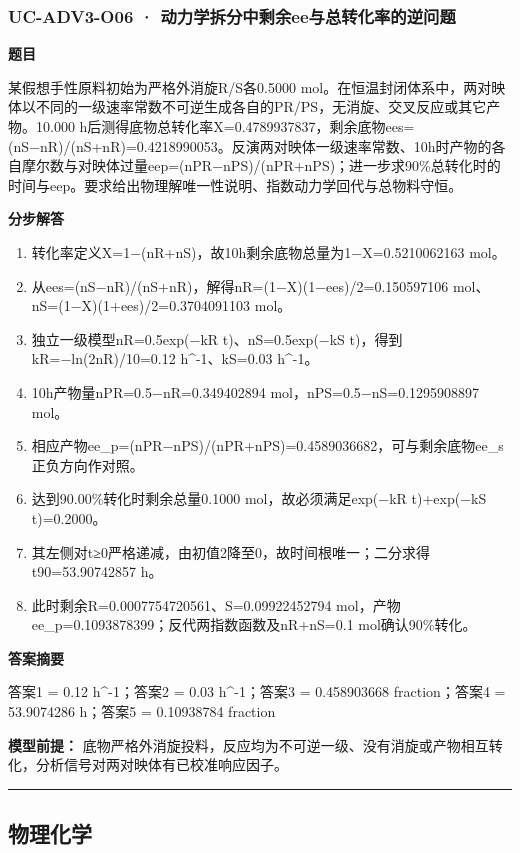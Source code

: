 \documentclass[UTF8,11pt,a4paper]{ctexart}
\begin{document}
\subsubsection*{UC-ADV3-O06 · 动力学拆分中剩余ee与总转化率的逆问题}
\noindent\textbf{题目}\par
某假想手性原料初始为严格外消旋R/S各0.5000 mol。在恒温封闭体系中，两对映体以不同的一级速率常数不可逆生成各自的PR/PS，无消旋、交叉反应或其它产物。10.000 h后测得底物总转化率X=0.4789937837，剩余底物ees=(nS−nR)/(nS+nR)=0.4218990053。反演两对映体一级速率常数、10h时产物的各自摩尔数与对映体过量eep=(nPR−nPS)/(nPR+nPS)；进一步求90\%总转化时的时间与eep。要求给出物理解唯一性说明、指数动力学回代与总物料守恒。\par
\medskip\noindent\textbf{分步解答}
\begin{enumerate}
\item 转化率定义X=1−(nR+nS)，故10h剩余底物总量为1−X=0.5210062163 mol。
\item 从ees=(nS−nR)/(nS+nR)，解得nR=(1−X)(1−ees)/2=0.150597106 mol、nS=(1−X)(1+ees)/2=0.3704091103 mol。
\item 独立一级模型nR=0.5exp(−kR t)、nS=0.5exp(−kS t)，得到kR=−ln(2nR)/10=0.12 h\textasciicircum{}-1、kS=0.03 h\textasciicircum{}-1。
\item 10h产物量nPR=0.5−nR=0.349402894 mol，nPS=0.5−nS=0.1295908897 mol。
\item 相应产物ee\_p=(nPR−nPS)/(nPR+nPS)=0.4589036682，可与剩余底物ee\_s正负方向作对照。
\item 达到90.00\%转化时剩余总量0.1000 mol，故必须满足exp(−kR t)+exp(−kS t)=0.2000。
\item 其左侧对t≥0严格递减，由初值2降至0，故时间根唯一；二分求得t90=53.90742857 h。
\item 此时剩余R=0.0007754720561、S=0.09922452794 mol，产物ee\_p=0.1093878399；反代两指数函数及nR+nS=0.1 mol确认90\%转化。
\end{enumerate}
\noindent\textbf{答案摘要}\par
答案1 = 0.12 h\textasciicircum{}-1；答案2 = 0.03 h\textasciicircum{}-1；答案3 = 0.458903668 fraction；答案4 = 53.9074286 h；答案5 = 0.10938784 fraction\par
\noindent\textbf{模型前提：}
底物严格外消旋投料，反应均为不可逆一级、没有消旋或产物相互转化，分析信号对两对映体有已校准响应因子。\par
\medskip\hrule\medskip
\subsection*{物理化学}
\end{document}
